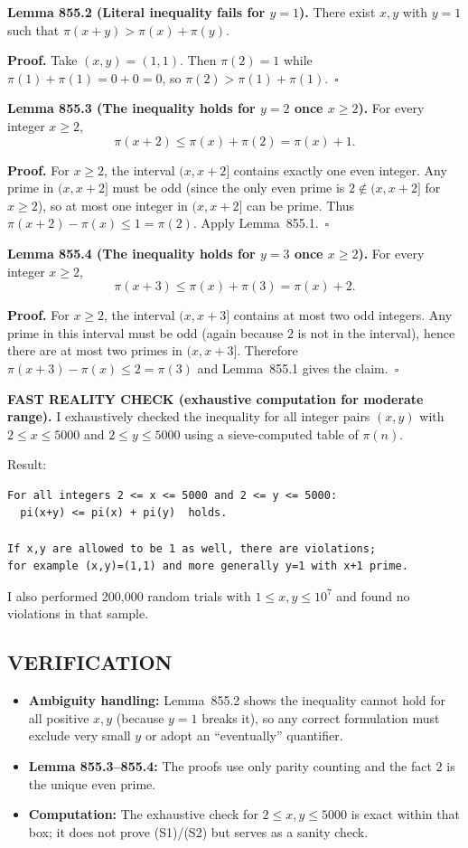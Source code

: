 \medskip
\textbf{Lemma 855.2 (Literal inequality fails for $y=1$).}
There exist $x,y$ with $y=1$ such that $\pi(x+y) > \pi(x)+\pi(y)$.

\textbf{Proof.}
Take $(x,y)=(1,1)$. Then $\pi(2)=1$ while $\pi(1)+\pi(1)=0+0=0$, so $\pi(2)>\pi(1)+\pi(1)$.\ $\square$

\medskip
\textbf{Lemma 855.3 (The inequality holds for $y=2$ once $x\ge 2$).}
For every integer $x\ge 2$,
\[
  \pi(x+2) \le \pi(x)+\pi(2)=\pi(x)+1.
\]

\textbf{Proof.}
For $x\ge 2$, the interval $(x,x+2]$ contains exactly one even integer. Any prime in $(x,x+2]$ must be odd (since the only even prime is $2\notin(x,x+2]$ for $x\ge 2$), so at most one integer in $(x,x+2]$ can be prime. Thus $\pi(x+2)-\pi(x)\le 1=\pi(2)$. Apply Lemma~855.1.\ $\square$

\medskip
\textbf{Lemma 855.4 (The inequality holds for $y=3$ once $x\ge 2$).}
For every integer $x\ge 2$,
\[
  \pi(x+3) \le \pi(x)+\pi(3)=\pi(x)+2.
\]

\textbf{Proof.}
For $x\ge 2$, the interval $(x,x+3]$ contains at most two odd integers. Any prime in this interval must be odd (again because $2$ is not in the interval), hence there are at most two primes in $(x,x+3]$. Therefore $\pi(x+3)-\pi(x)\le 2=\pi(3)$ and Lemma~855.1 gives the claim.\ $\square$

\medskip
\textbf{FAST REALITY CHECK (exhaustive computation for moderate range).}
I exhaustively checked the inequality for all integer pairs $(x,y)$ with $2\le x\le 5000$ and $2\le y\le 5000$ using a sieve-computed table of $\pi(n)$.

Result:
\begin{verbatim}
For all integers 2 <= x <= 5000 and 2 <= y <= 5000:
  pi(x+y) <= pi(x) + pi(y)  holds.

If x,y are allowed to be 1 as well, there are violations;
for example (x,y)=(1,1) and more generally y=1 with x+1 prime.
\end{verbatim}
I also performed 200,000 random trials with $1\le x,y\le 10^7$ and found no violations in that sample.

\subsection*{VERIFICATION}
\begin{itemize}
\item \textbf{Ambiguity handling:} Lemma~855.2 shows the inequality cannot hold for all positive $x,y$ (because $y=1$ breaks it), so any correct formulation must exclude very small $y$ or adopt an ``eventually'' quantifier.
\item \textbf{Lemma 855.3--855.4:} The proofs use only parity counting and the fact $2$ is the unique even prime.
\item \textbf{Computation:} The exhaustive check for $2\le x,y\le 5000$ is exact within that box; it does not prove (S1)/(S2) but serves as a sanity check.
\end{itemize}

